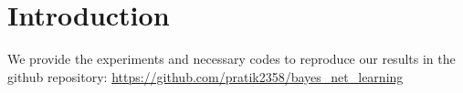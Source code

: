 \section{Introduction}
We provide the experiments and necessary codes to reproduce our results in the github repository: \url{https://github.com/pratik2358/bayes_net_learning}